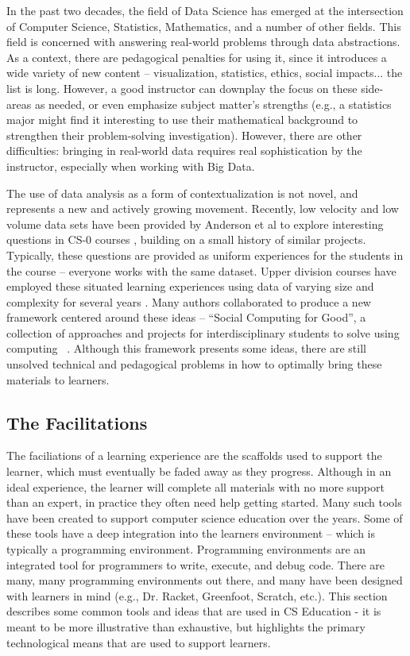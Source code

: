 In the past two decades, the field of Data Science has emerged at the intersection of Computer Science, Statistics, Mathematics, and a number of other fields.
This field is concerned with answering real-world problems through data abstractions.
As a context, there are pedagogical penalties for using it, since it introduces a wide variety of new content -- visualization, statistics, ethics, social impacts... the list is long.
However, a good instructor can downplay the focus on these side-areas as needed, or even emphasize subject matter's strengths (e.g., a statistics major might find it interesting to use their mathematical background to strengthen their problem-solving investigation).
However, there are other difficulties: bringing in real-world data requires real sophistication by the instructor, especially when working with Big Data.

The use of data analysis as a form of contextualization is not novel, and represents a new and actively growing movement.
Recently, low velocity and low volume data sets have been provided by Anderson et al to explore interesting questions in CS-0 courses \cite{Anderson}, building on a small history of similar projects.
Typically, these questions are provided as uniform experiences for the students in the course -- everyone works with the same dataset.
Upper division courses have employed these situated learning experiences using data of varying size and complexity for several years \cite{Egger, datamining, Waldman}.
Many authors collaborated to produce a new framework centered around these ideas -- ``Social Computing for Good'', a collection of approaches and projects for interdisciplinary students to solve using computing ~\cite{Social-good}.
Although this framework presents some ideas, there are still unsolved technical and pedagogical problems in how to optimally bring these materials to learners.

\subsection{The Facilitations}

The faciliations of a learning experience are the scaffolds used to support the learner, which must eventually be faded away as they progress.
Although in an ideal experience, the learner will complete all materials with no more support than an expert, in practice they often need help getting started.
Many such tools have been created to support computer science education over the years.
Some of these tools have a deep integration into the learners environment  -- which is typically a programming environment.
Programming environments are an integrated tool for programmers to write, execute, and debug code.
There are many, many programming environments out there, and many have been designed with learners in mind (e.g., Dr. Racket, Greenfoot, Scratch, etc.).
This section describes some common tools and ideas that are used in CS Education - it is meant to be more illustrative than exhaustive, but highlights the primary technological means that are used to support learners.

